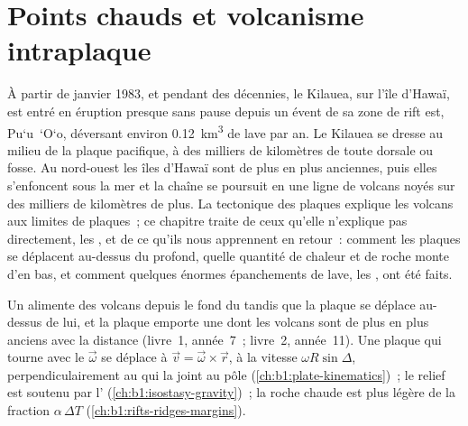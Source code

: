 \chapter{Points chauds et volcanisme intraplaque}\label{ch:b1:hotspots}

À partir de janvier 1983, et pendant des décennies, le Kilauea, sur l'île d'Hawaï,
est entré en éruption presque sans pause depuis un évent de sa zone de rift est,
Pu\textquoteleft u~\textquoteleft O\textquoteleft o, déversant environ
\qty{0.12}{km^3} de lave par an. Le Kilauea se dresse au milieu de la plaque pacifique,
à des milliers de kilomètres de toute dorsale ou fosse. Au nord-ouest les
îles d'Hawaï sont de plus en plus anciennes, puis elles s'enfoncent sous la mer et la
chaîne se poursuit en une ligne de volcans noyés sur des milliers de kilomètres de plus.
La tectonique des plaques explique les volcans aux limites de plaques~; ce chapitre traite
de ceux qu'elle n'explique pas directement, les , et de ce qu'ils nous
apprennent en retour~: comment les plaques se déplacent au-dessus du  profond, quelle quantité de chaleur et de roche
monte d'en bas, et comment quelques énormes épanchements de lave, les , ont été faits.

\begin{recall}
Un  alimente des volcans depuis le fond du  tandis que la plaque se déplace au-dessus
de lui, et la plaque emporte une  dont les volcans sont de plus en plus anciens
avec la distance (livre~1, année~7~; livre~2, année~11). Une plaque qui tourne avec le 
$\vec\omega$ se déplace à $\vec v = \vec\omega\times\vec r$, à la vitesse
$\omega R\sin\Delta$, perpendiculairement au  qui la joint au
pôle (\cref{ch:b1:plate-kinematics})~; le relief est soutenu par l'
(\cref{ch:b1:isostasy-gravity})~; la roche chaude est plus légère de la fraction
$\alpha\,\Delta T$ (\cref{ch:b1:rifts-ridges-margins}).
\end{recall}

